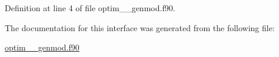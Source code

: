 Definition at line 4 of file optim\+\_\+\+\_\+genmod.\+f90.



The documentation for this interface was generated from the following file\+:\begin{DoxyCompactItemize}
\item 
\hyperlink{optim____genmod_8f90}{optim\+\_\+\+\_\+genmod.\+f90}\end{DoxyCompactItemize}
